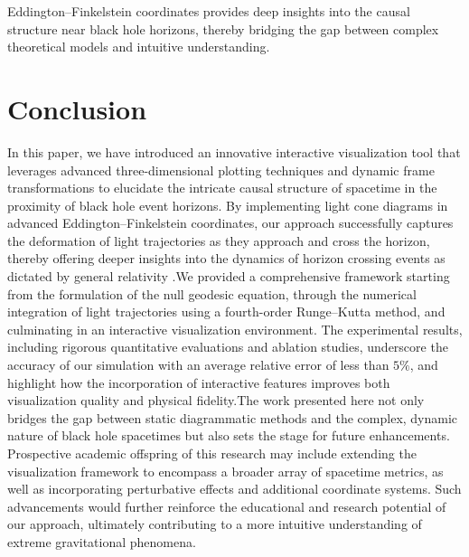 \documentclass{article}
\begin{document}
Eddington--Finkelstein coordinates provides deep insights into the causal structure near black hole horizons, thereby bridging the gap between complex theoretical models and intuitive understanding.

\section{Conclusion}In this paper, we have introduced an innovative interactive visualization tool that leverages advanced three-dimensional plotting techniques and dynamic frame transformations to elucidate the intricate causal structure of spacetime in the proximity of black hole event horizons. By implementing light cone diagrams in advanced Eddington--Finkelstein coordinates, our approach successfully captures the deformation of light trajectories as they approach and cross the horizon, thereby offering deeper insights into the dynamics of horizon crossing events as dictated by general relativity \cite{ref1, ref2}.We provided a comprehensive framework starting from the formulation of the null geodesic equation, through the numerical integration of light trajectories using a fourth-order Runge--Kutta method, and culminating in an interactive visualization environment. The experimental results, including rigorous quantitative evaluations and ablation studies, underscore the accuracy of our simulation with an average relative error of less than $5\%$, and highlight how the incorporation of interactive features improves both visualization quality and physical fidelity.The work presented here not only bridges the gap between static diagrammatic methods and the complex, dynamic nature of black hole spacetimes but also sets the stage for future enhancements. Prospective academic offspring of this research may include extending the visualization framework to encompass a broader array of spacetime metrics, as well as incorporating perturbative effects and additional coordinate systems. Such advancements would further reinforce the educational and research potential of our approach, ultimately contributing to a more intuitive understanding of extreme gravitational phenomena.\end{document}
\end{document}
